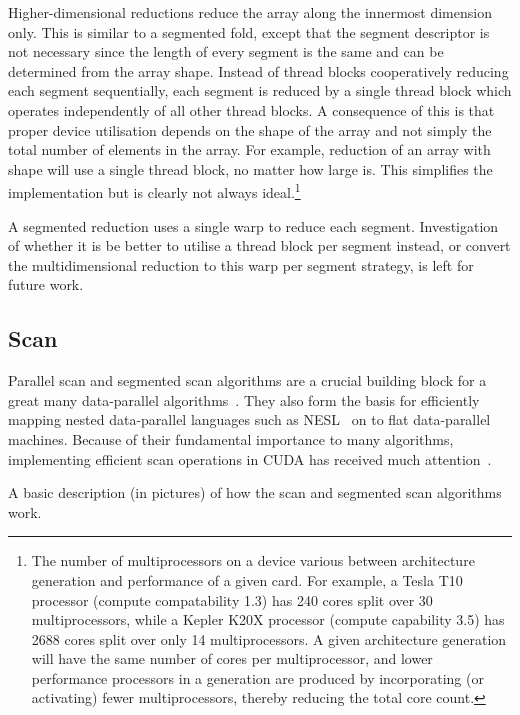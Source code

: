 Higher-dimensional reductions reduce the array along the innermost dimension
only. This is similar to a segmented fold, except that the segment descriptor is
not necessary since the length of every segment is the same and can be
determined from the array shape. Instead of thread blocks cooperatively reducing
each segment sequentially, each segment is reduced by a single thread block
which operates independently of all other thread blocks. A consequence of this
is that proper device utilisation depends on the shape of the array and not
simply the total number of elements in the array. For example, reduction of an
array with shape  will use a single thread block, no matter
how large  is. This simplifies the implementation but is clearly not
always ideal.\footnote{The number of multiprocessors on a device various between
architecture generation and performance of a given card. For example, a Tesla
T10 processor (compute compatability 1.3) has 240 cores split over 30
multiprocessors, while a Kepler K20X processor (compute capability 3.5) has 2688
cores split over only 14 multiprocessors. A given architecture generation will
have the same number of cores per multiprocessor, and lower performance
processors in a generation are produced by incorporating (or activating) fewer
multiprocessors, thereby reducing the total core count.}

A segmented reduction uses a single warp to reduce each segment. Investigation
of whether it is be better to utilise a thread block per segment instead, or
convert the multidimensional reduction to this warp per segment strategy, is
left for future work.


\subsection{Scan}

Parallel scan and segmented scan algorithms are a crucial building block for a
great many data-parallel algorithms~\cite{Blelloch:1990ts,Chatterjee:1990vj}.
They also form the basis for efficiently mapping nested data-parallel languages
such as NESL~\cite{Blelloch:1995ut,Blelloch:1996jx} on to flat data-parallel
machines. Because of their fundamental importance to many algorithms,
implementing efficient scan operations in CUDA has received much
attention~\cite{Sengupta:2007tc,Dotsenko:2008fo,Harris:2012fy}.

A basic description (in pictures) of how the scan and segmented scan algorithms
work.


